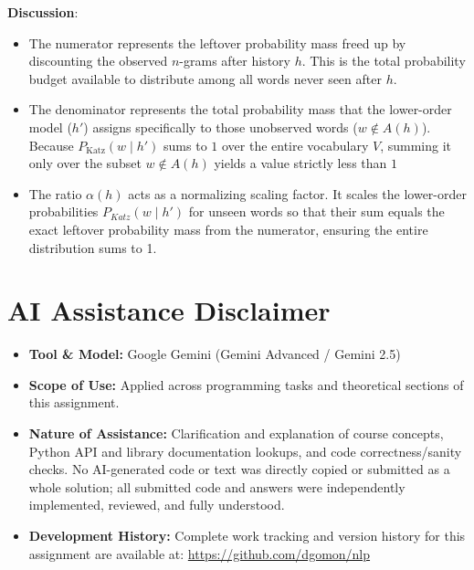 \documentclass{article}
\numberwithin{equation}{section}
\begin{document}
    \textbf{Discussion}:
    \begin{itemize}
        \item The numerator represents the leftover probability mass freed up by discounting the observed $n$-grams after history $h$. This is the total probability budget available to distribute among all words never seen after $h$.
        \item The denominator represents the total probability mass that the lower-order model ($h'$) assigns specifically to those unobserved words ($w \notin A(h)$). Because $P_{\text{Katz}}(w \mid h')$ sums to $1$ over the entire vocabulary $V$, summing it only over the subset $w \notin A(h)$ yields a value strictly less than $1$
        \item The ratio $\alpha(h)$ acts as a normalizing scaling factor. It scales the lower-order probabilities $P_{Katz}(w \mid h')$ for unseen words so that their sum equals the exact leftover probability mass from the numerator, ensuring the entire distribution sums to 1.
    \end{itemize}


    \section*{AI Assistance Disclaimer}
    \begin{itemize}
    \item \textbf{Tool \& Model:} Google Gemini (Gemini Advanced / Gemini 2.5)
    \item \textbf{Scope of Use:} Applied across programming tasks and theoretical sections of this assignment.
    \item \textbf{Nature of Assistance:} Clarification and explanation of course concepts, Python API and library documentation lookups, and code correctness/sanity checks. No AI-generated code or text was directly copied or submitted as a whole solution; all submitted code and answers were independently implemented, reviewed, and fully understood.
    \item \textbf{Development History:} Complete work tracking and version history for this assignment are available at: \href{https://github.com/dgomon/nlp}{https://github.com/dgomon/nlp}
    \end{itemize}
\end{document}
